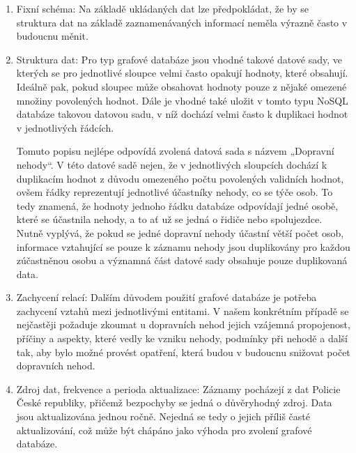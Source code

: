 \documentclass[a4paper, 11pt]{article}
\begin{document}
    \begin{enumerate}
        \item Fixní schéma: Na základě ukládaných dat lze předpokládat, že by se struktura dat na základě zaznamenávaných informací neměla výrazně často v budoucnu měnit.

        \item Struktura dat: Pro typ grafové databáze jsou vhodné takové datové sady, ve kterých se pro jednotlivé sloupce velmi často opakují hodnoty, které obsahují. Ideálně pak, pokud sloupec může obsahovat hodnoty pouze z nějaké omezené množiny povolených hodnot. Dále je vhodné také uložit v tomto typu NoSQL databáze takovou datovou sadu, v níž dochází velmi často k duplikaci hodnot v jednotlivých řádcích.

        Tomuto popisu nejlépe odpovídá zvolená datová sada s názvem „Dopravní nehody“. V této datové sadě nejen, že v jednotlivých sloupcích dochází k duplikacím hodnot z důvodu omezeného počtu povolených validních hodnot, ovšem řádky reprezentují jednotlivé účastníky nehody, co se týče osob. To tedy znamená, že hodnoty jednoho řádku databáze odpovídají jedné osobě, které se účastnila nehody, a to ať už se jedná o řidiče nebo spolujezdce. Nutně vyplývá, že pokud se jedné dopravní nehody účastní větší počet osob, informace vztahující se pouze k záznamu nehody jsou duplikovány pro každou zúčastněnou osobu a významná část datové sady obsahuje pouze duplikovaná data.

        \item Zachycení relací: Dalším důvodem použití grafové databáze je potřeba zachycení vztahů mezi jednotlivými entitami. V našem konkrétním případě se nejčastěji požaduje zkoumat u dopravních nehod jejich vzájemná propojenost, příčiny a aspekty, které vedly ke vzniku nehody, podmínky při nehodě a další tak, aby bylo možné provést opatření, která budou v budoucnu snižovat počet dopravních nehod.

        \item Zdroj dat, frekvence a perioda aktualizace: Záznamy pocházejí z dat Policie České republiky, přičemž bezpochyby se jedná o důvěryhodný zdroj. Data jsou aktualizována jednou ročně. Nejedná se tedy o jejich příliš časté aktualizování, což může být chápáno jako výhoda pro zvolení grafové databáze.


\end{enumerate}
\end{document}
